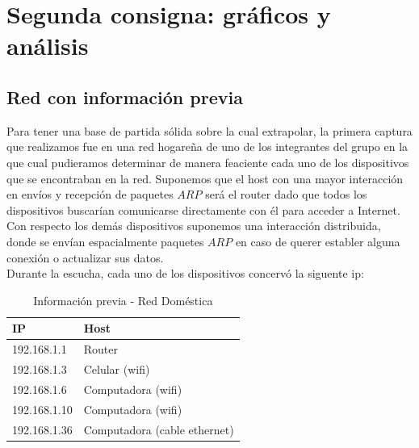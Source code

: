 \section{Segunda consigna: gráficos y análisis}

\subsection{Red con información previa}

Para tener una base de partida sólida sobre la cual extrapolar, la primera captura que realizamos fue en una red hogareña de uno de los integrantes 
del grupo en la que cual pudieramos determinar de manera feaciente cada uno de los dispositivos que se encontraban en la red. Suponemos que el host
con una mayor interacción en envíos y recepción de paquetes $ARP$ será el router dado que todos los dispositivos buscarían comunicarse directamente
con él para acceder a Internet. Con respecto los demás dispositivos suponemos una interacción distribuida, donde se envían espacialmente paquetes $ARP$
en caso de querer establer alguna conexión o actualizar sus datos.\\

Durante la escucha, cada uno de los dispositivos concervó la siguente ip:\\
\begin{table}[htb]
\begin{center}
\begin{tabular}{|l|l|}
\hline
IP & Host \\
\hline \hline
192.168.1.1 & Router \\ \hline
192.168.1.3 & Celular (wifi) \\ \hline
192.168.1.6 & Computadora (wifi)  \\ \hline
192.168.1.10 & Computadora (wifi) \\ \hline
192.168.1.36 & Computadora (cable ethernet) \\ \hline
\end{tabular}
\caption{Información previa - Red Doméstica}
\label{tabla informacion}
\end{center}
\end{table}


